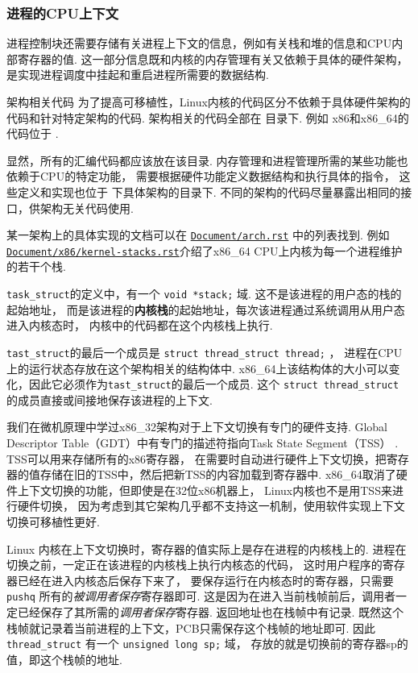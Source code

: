\subsubsection{进程的CPU上下文} \label{context}
进程控制块还需要存储有关进程上下文的信息，例如有关栈和堆的信息和CPU内部寄存器的值.%
这一部分信息既和内核的内存管理有关又依赖于具体的硬件架构，
是实现进程调度中挂起和重启进程所需要的数据结构.
\begin{readsrcbox}{架构相关代码}
	为了提高可移植性，Linux内核的代码区分不依赖于具体硬件架构的代码和针对特定架构的代码.
	架构相关的代码全部在  目录下.
	例如 x86和x86\_64的代码位于 .

	显然，所有的汇编代码都应该放在该目录.
	内存管理和进程管理所需的某些功能也依赖于CPU的特定功能，
	需要根据硬件功能定义数据结构和执行具体的指令，
	这些定义和实现也位于  下具体架构的目录下.
	不同的架构的代码尽量暴露出相同的接口，供架构无关代码使用.

	某一架构上的具体实现的文档可以在 \href{https://docs.kernel.org/arch.html}{\lstinline{Document/arch.rst}} 中的列表找到.
	例如\href{https://docs.kernel.org/x86/kernel-stacks.html}{\lstinline{Document/x86/kernel-stacks.rst}}介绍了x86\_64 CPU上内核为每一个进程维护的若干个栈.
\end{readsrcbox}
\lstinline{task_struct}的定义中，有一个 \lstinline{void *stack;} 域.
这不是该进程的用户态的栈的起始地址，
而是该进程的\textbf{内核栈}的起始地址，每次该进程通过系统调用从用户态进入内核态时，
内核中的代码都在这个内核栈上执行.

\lstinline{tast_struct}的最后一个成员是 \lstinline{struct thread_struct thread;}%
，
进程在CPU上的运行状态存放在这个架构相关的结构体中.
x86\_64上该结构体的大小可以变化，因此它必须作为\lstinline{tast_struct}的最后一个成员.
这个 \lstinline{struct thread_struct} 的成员直接或间接地保存该进程的上下文.

我们在微机原理中学过x86\_32架构对于上下文切换有专门的硬件支持.
Global Descriptor Table（GDT）中有专门的描述符指向Task State Segment（TSS）%
.
TSS可以用来存储所有的x86寄存器，
在需要时自动进行硬件上下文切换，把寄存器的值存储在旧的TSS中，然后把新TSS的内容加载到寄存器中.
x86\_64取消了硬件上下文切换的功能，但即使是在32位x86机器上，
Linux内核也不是用TSS来进行硬件切换，
因为考虑到其它架构几乎都不支持这一机制，使用软件实现上下文切换可移植性更好.

Linux 内核在上下文切换时，寄存器的值实际上是存在进程的内核栈上的.
进程在切换之前，一定正在该进程的内核栈上执行内核态的代码，
这时用户程序的寄存器已经在进入内核态后保存下来了，
要保存运行在内核态时的寄存器，只需要 \lstinline{pushq} 所有的\textit{被调用者保存}寄存器即可.
这是因为在进入当前栈帧前后，调用者一定已经保存了其所需的\textit{调用者保存}寄存器.
返回地址也在栈帧中有记录.
既然这个栈帧就记录着当前进程的上下文，PCB只需保存这个栈帧的地址即可.
因此 \lstinline{thread_struct} 有一个 \lstinline{unsigned long sp;} 域，
存放的就是切换前的寄存器sp的值，即这个栈帧的地址.

